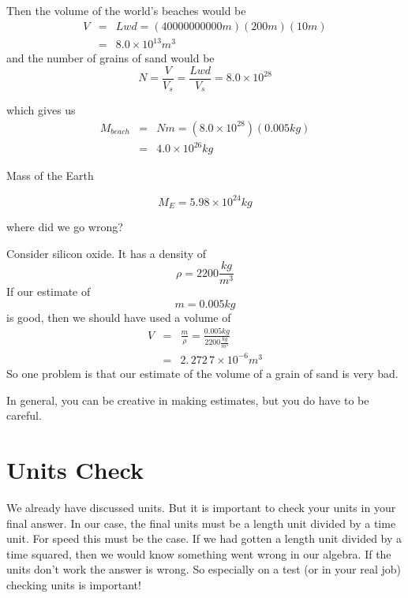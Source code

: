 \documentclass[]{Book}
\begin{document}
Then the volume of the world's beaches would be%
\begin{eqnarray}
	V &=&Lwd=\left( 40000000000\unit{m}\right) \left( 200\unit{m}\right) \left(
	10\unit{m}\right) \\
	&=&8.0\times 10^{13}\unit{m}^{3}
\end{eqnarray}
and the number of grains of sand would be%
\begin{equation}
	N=\frac{V}{V_{s}}=\frac{Lwd}{V_{s}}=\allowbreak 8.0\times 10^{28}
\end{equation}

which gives us%
\begin{eqnarray}
	M_{beach} &=&Nm=\left( \allowbreak 8.0\times 10^{28}\right) \left( 0.005%
	\unit{kg}\right) \\
	&=&4.0\times 10^{26}\unit{kg}
\end{eqnarray}

Mass of the Earth

\begin{equation}
	M_{E}=5.98\times 10^{24}\unit{kg}
\end{equation}

where did we go wrong?

Consider silicon oxide. It has a density of 
\begin{equation}
	\rho =2200\frac{\unit{kg}}{\unit{m}^{3}}
\end{equation}%
If our estimate of 
\begin{equation}
	m=0.005\unit{kg}
\end{equation}%
is good, then we should have used a volume of%
\begin{eqnarray}
	V &=&\frac{m}{\rho }=\frac{0.005\unit{kg}}{2200\frac{\unit{kg}}{\unit{m}^{3}}%
	} \\
	&=&2.\,\allowbreak 272\,7\times 10^{-6}\allowbreak \unit{m}^{3}
\end{eqnarray}%
So one problem is that our estimate of the volume of a grain of sand is very
bad.

In general, you can be creative in making estimates, but you do have to be
careful.

\section{Units Check}

We already have discussed units. But it is important to check your units in
your final answer. In our case, the final units must be a length unit
divided by a time unit. For speed this must be the case. If we had gotten a
length unit divided by a time squared, then we would know something went
wrong in our algebra. If the units don't work the answer is wrong. So
especially on a test (or in your real job) checking units is important!
\end{document}
